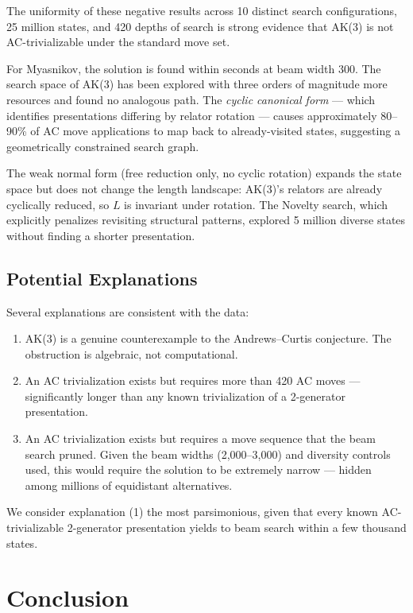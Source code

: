 \documentclass[12pt,a4paper]{article}
\begin{document}
The uniformity of these negative results across 10 distinct search configurations, 25 million states, and 420 depths of search is strong evidence that AK(3) is not AC-trivializable under the standard move set.

For Myasnikov, the solution is found within seconds at beam width 300. The search space of AK(3) has been explored with three orders of magnitude more resources and found no analogous path. The \emph{cyclic canonical form} --- which identifies presentations differing by relator rotation --- causes approximately 80--90\% of AC move applications to map back to already-visited states, suggesting a geometrically constrained search graph.

The weak normal form (free reduction only, no cyclic rotation) expands the state space but does not change the length landscape: AK(3)'s relators are already cyclically reduced, so $L$ is invariant under rotation. The Novelty search, which explicitly penalizes revisiting structural patterns, explored 5 million diverse states without finding a shorter presentation.

\subsection{Potential Explanations}

Several explanations are consistent with the data:

\begin{enumerate}
  \item AK(3) is a genuine counterexample to the Andrews--Curtis conjecture. The obstruction is algebraic, not computational.
  \item An AC trivialization exists but requires more than 420 AC moves --- significantly longer than any known trivialization of a 2-generator presentation.
  \item An AC trivialization exists but requires a move sequence that the beam search pruned. Given the beam widths (2,000--3,000) and diversity controls used, this would require the solution to be extremely narrow --- hidden among millions of equidistant alternatives.
\end{enumerate}

We consider explanation (1) the most parsimonious, given that every known AC-trivializable 2-generator presentation yields to beam search within a few thousand states.

\section{Conclusion}
\end{document}
